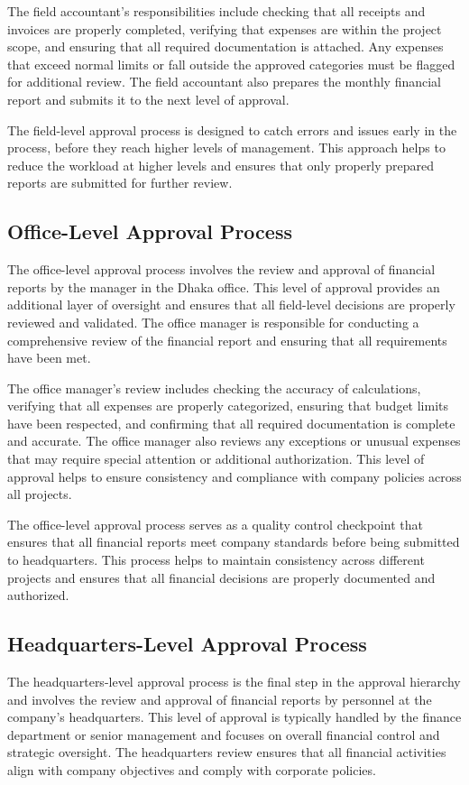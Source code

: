 The field accountant's responsibilities include checking that all receipts and invoices are properly completed, verifying that expenses are within the project scope, and ensuring that all required documentation is attached. Any expenses that exceed normal limits or fall outside the approved categories must be flagged for additional review. The field accountant also prepares the monthly financial report and submits it to the next level of approval.

The field-level approval process is designed to catch errors and issues early in the process, before they reach higher levels of management. This approach helps to reduce the workload at higher levels and ensures that only properly prepared reports are submitted for further review.

\subsection{Office-Level Approval Process}
The office-level approval process involves the review and approval of financial reports by the manager in the Dhaka office. This level of approval provides an additional layer of oversight and ensures that all field-level decisions are properly reviewed and validated. The office manager is responsible for conducting a comprehensive review of the financial report and ensuring that all requirements have been met.

The office manager's review includes checking the accuracy of calculations, verifying that all expenses are properly categorized, ensuring that budget limits have been respected, and confirming that all required documentation is complete and accurate. The office manager also reviews any exceptions or unusual expenses that may require special attention or additional authorization. This level of approval helps to ensure consistency and compliance with company policies across all projects.

The office-level approval process serves as a quality control checkpoint that ensures that all financial reports meet company standards before being submitted to headquarters. This process helps to maintain consistency across different projects and ensures that all financial decisions are properly documented and authorized.

\subsection{Headquarters-Level Approval Process}
The headquarters-level approval process is the final step in the approval hierarchy and involves the review and approval of financial reports by personnel at the company's headquarters. This level of approval is typically handled by the finance department or senior management and focuses on overall financial control and strategic oversight. The headquarters review ensures that all financial activities align with company objectives and comply with corporate policies.

